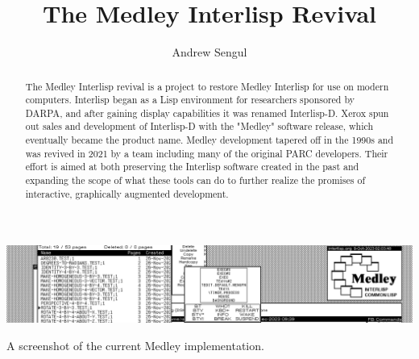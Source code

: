\documentclass[sigconf]{acmart}
\begin{document}
\title{The Medley Interlisp Revival}


\author{Andrew Sengul}


\begin{abstract}
  The Medley Interlisp revival is a project to restore Medley Interlisp for use on modern computers. Interlisp began as a Lisp environment for researchers sponsored by DARPA, and after gaining display capabilities it was renamed Interlisp-D. Xerox spun out sales and development of Interlisp-D with the "Medley" software release, which eventually became the product name. Medley development tapered off in the 1990s and was revived in 2021 by a team including many of the original PARC developers. Their effort is aimed at both preserving the Interlisp software created in the past and expanding the scope of what these tools can do to further realize the promises of interactive, graphically augmented development.
\end{abstract}

\begin{CCSXML}
\end{CCSXML}

\begin{teaserfigure}
  \includegraphics[width=\textwidth]{MedleyShot02t}
  \caption{A screenshot of the current Medley implementation.}
  \label{fig:teaser}
\end{teaserfigure}
\end{document}
